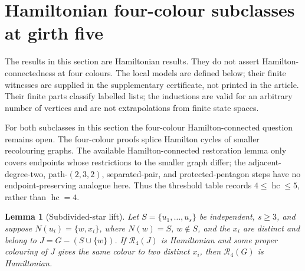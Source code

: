 \documentclass[11pt]{article}
\newtheorem{lemma}[theorem]{Lemma}
\theoremstyle{remark}
\newcommand{\R}{\mathcal R}
\newcommand{\hc}{\operatorname{hc}}
\numberwithin{equation}{section}
\numberwithin{table}{section}
\begin{document}
\section{Hamiltonian four-colour subclasses at girth five}
\label{sec:four-colour-subclasses}

The results in this section are Hamiltonian results.  They do not assert
Hamilton-connectedness at four colours.  The local models are defined
below; their finite witnesses are supplied in the supplementary certificate, not printed in the article.
Their finite parts classify
labelled lists; the inductions are valid for an arbitrary number of
vertices and are not extrapolations from finite state spaces.

For both subclasses in this section the four-colour Hamilton-connected
question remains open.  The four-colour proofs splice Hamilton cycles of
smaller recolouring graphs.  The available Hamilton-connected restoration
lemma only covers endpoints whose restrictions to the smaller graph differ;
the adjacent-degree-two, path-$(2,3,2)$, separated-pair, and
protected-pentagon steps have no
endpoint-preserving analogue here.  Thus the threshold table records
$4\le\hc\le5$, rather than $\hc=4$.







\begin{lemma}[Subdivided-star lift]
\label{lem:subdivided-star-four-subclass}
Let $S=\{u_1,\ldots,u_s\}$ be independent, $s\ge3$, and suppose
$N(u_i)=\{w,x_i\}$, where $N(w)=S$, $w\notin S$, and the $x_i$ are distinct and belong to
$J=G-(S\cup\{w\})$.  If $\R_4(J)$ is Hamiltonian and some proper colouring
of $J$ gives the same colour to two distinct $x_i$, then $\R_4(G)$ is
Hamiltonian.
\end{lemma}
\end{document}
